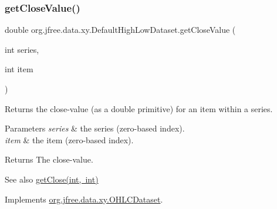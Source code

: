 \mbox{\label{classorg_1_1jfree_1_1data_1_1xy_1_1_default_high_low_dataset_af316dffa7faed1c0c8c2f66b7b0acf5f}} 
\subsubsection{\texorpdfstring{get\+Close\+Value()}{getCloseValue()}}
{\footnotesize\ttfamily double org.\+jfree.\+data.\+xy.\+Default\+High\+Low\+Dataset.\+get\+Close\+Value (\begin{DoxyParamCaption}\item[{int}]{series,  }\item[{int}]{item }\end{DoxyParamCaption})}

Returns the close-\/value (as a double primitive) for an item within a series.


\begin{DoxyParams}{Parameters}
{\em series} & the series (zero-\/based index). \\
\hline
{\em item} & the item (zero-\/based index).\\
\hline
\end{DoxyParams}
\begin{DoxyReturn}{Returns}
The close-\/value.
\end{DoxyReturn}
\begin{DoxySeeAlso}{See also}
\mbox{\hyperlink{classorg_1_1jfree_1_1data_1_1xy_1_1_default_high_low_dataset_a12694885b103c14192fea35616c464f9}{get\+Close(int, int)}} 
\end{DoxySeeAlso}


Implements \mbox{\hyperlink{interfaceorg_1_1jfree_1_1data_1_1xy_1_1_o_h_l_c_dataset_a5533f5d89de4aec9d67cfdc9289a1099}{org.\+jfree.\+data.\+xy.\+O\+H\+L\+C\+Dataset}}.

\mbox{\label{classorg_1_1jfree_1_1data_1_1xy_1_1_default_high_low_dataset_a3a49c92b4564fa5d6c9628b4395feaef}} 
